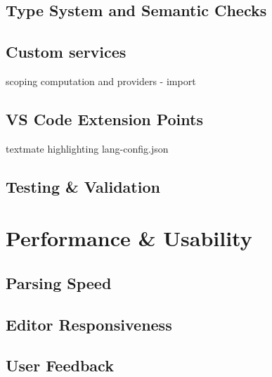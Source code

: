 \section{Type System and Semantic Checks}
\section*{Custom services}
\label{sec:customservices}
scoping computation and providers - import
\section{VS Code Extension Points}
textmate highlighting lang-config.json
\section{Testing \& Validation}

\chapter{Performance \& Usability}
\section{Parsing Speed}
\section{Editor Responsiveness}
\section{User Feedback}